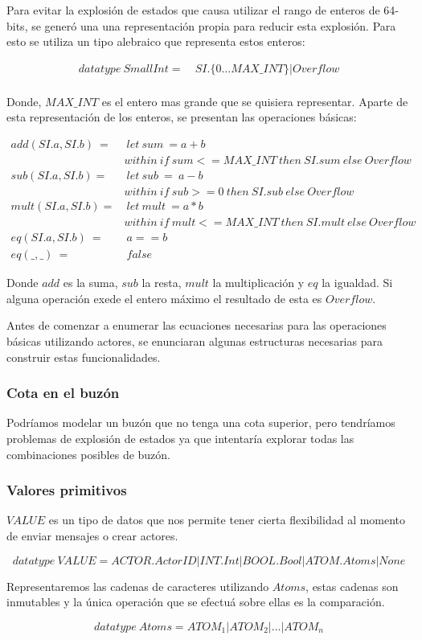 Para evitar la explosión de estados que causa utilizar el rango de enteros de 64-bits, se generó una una representación propia para reducir esta explosión. Para esto se utiliza un tipo alebraico que representa estos enteros:

\begin{align*}
datatype\ SmallInt =&\ SI.\{0 \ldots MAX\_INT\} | Overflow \\
\end{align*}

Donde, $MAX\_INT$ es el entero mas grande que se quisiera representar. Aparte de esta representación de los enteros, se presentan las operaciones básicas:

\begin{align*}
add(SI.a, SI.b)\ =&\ let\ sum\ = a + b \\
&within\ if\ sum <= MAX\_INT\ then\ SI.sum\ else\ Overflow  \\
%
sub(SI.a, SI.b) =&\ let\ sub\ =\ a - b \\
& within\ if\ sub >= 0\ then\ SI.sub\ else\ Overflow \\
%
mult(SI.a, SI.b) =&\ let\ mult\ = a * b \\
& within\ if\ mult <= MAX\_INT\ then\ SI.mult\ else\ Overflow \\
eq(SI.a, SI.b)\ =&\ a == b \\
eq(\_, \_)\ =&\ false
\end{align*}

Donde $add$ es la suma, $sub$ la resta, $mult$ la multiplicación y $eq$ la igualdad. Si alguna operación exede el entero máximo el resultado de esta es $Overflow$.

Antes de comenzar a enumerar las ecuaciones necesarias para las operaciones básicas utilizando actores, se enunciaran algunas estructuras necesarias para construir estas funcionalidades.

\subsubsection*{Cota en el buzón}

Podríamos modelar un buzón que no tenga una cota superior, pero tendríamos problemas de explosión de estados ya que \FDR intentaría explorar todas las combinaciones posibles de buzón.

\subsubsection*{Valores primitivos}

$VALUE$ es un tipo de datos que nos permite tener cierta flexibilidad al momento de enviar mensajes o crear actores. 

\[
  datatype\ VALUE = ACTOR.ActorID | INT.Int | BOOL.Bool | ATOM.Atoms | None
\]

Representaremos las cadenas de caracteres utilizando $Atoms$, estas cadenas son inmutables y la única operación que se efectuá sobre ellas es la comparación.

\[
  datatype\ Atoms = ATOM_1 | ATOM_2 | \ldots | ATOM_n
\]

